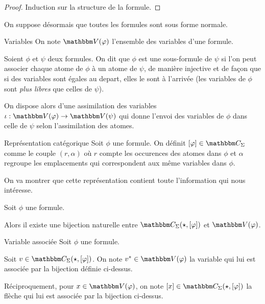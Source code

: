 \begin{proof} Induction sur la structure de la formule.
\end{proof}

On suppose désormais que toutes les formules sont sous forme normale.

\begin{defi}{Variables}
    On note $\V(\phi)$ l'ensemble des variables d'une formule.
\end{defi}

\begin{rem}
    Soient $\phi$ et $\psi$ deux formules. On dit que $\phi$ est une sous-formule
    de $\psi$ si l'on peut associer chaque atome de $\phi$ à un atome de $\psi$, de
    manière injective et de façon que si des variables sont égales au depart, elles
    le sont à l'arrivée (les variables de $\phi$ sont \emph{plus libres} que celles
    de $\psi$).

    On dispose alors d'une assimilation des variables
    $\iota : \V(\phi)\rightarrow \V(\psi)$ qui donne l'envoi des variables de $\phi$
    dans celle de $\psi$ selon l'assimilation des atomes.
\end{rem}

\begin{defi}{Représentation catégorique}
    Soit $\phi$ une formule. On définit $[\phi]\in\C_\Sigma$ comme le couple $(r,\alpha)$
    où $r$ compte les occurences des atomes dans $\phi$ et $\alpha$ regroupe les
    emplacements qui correspondent aux même variables dans $\phi$.
\end{defi}

On va montrer que cette représentation contient toute l'information qui nous intéresse.

\begin{lem}
    Soit $\phi$ une formule.

    Alors il existe une bijection naturelle entre $\C_\Sigma(\star, [\phi])$ et
    $\V(\phi)$.
\end{lem}

\begin{defi}{Variable associée}
    Soit $\phi$ une formule.

    Soit $v\in\C_\Sigma(\star, [\phi])$. On note $v^*\in\V(\phi)$ la variable qui
    lui est associée par la bijection définie ci-dessus.

    Réciproquement, pour $x\in\V(\phi)$, on note $[x]\in\C_\Sigma(\star, [\phi])$
    la flèche qui lui est associée par la bijection ci-dessus.
\end{defi}

